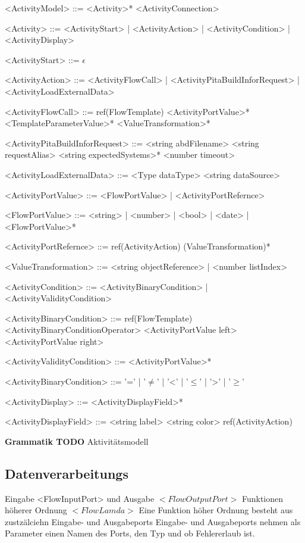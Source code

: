 \documentclass{article}
\begin{document}
    \begin{grammar}
        <ActivityModel> ::= <Activity>* <ActivityConnection>

        <Activity> ::= <ActivityStart>
        | <ActivityAction>
        | <ActivityCondition>
        | <ActivityDisplay>

        <ActivityStart> ::= $\epsilon$

        <ActivityAction> ::= <ActivityFlowCall>
        | <ActivityPitaBuildInforRequest>
        | <ActivityLoadExternalData>

        <ActivityFlowCall> ::= ref(FlowTemplate) <ActivityPortValue>* <TemplateParameterValue>* <ValueTransformation>*

        <ActivityPitaBuildInforRequest> ::= <string abdFilename> <string requestAlias> <string expectedSystems>* <number timeout>

        <ActivityLoadExternalData> ::= <Type dataType> <string dataSource>

        <ActivityPortValue> ::= <FlowPortValue>
        | <ActivityPortRefernce>

        <FlowPortValue> ::= <string>
        | <number>
        | <bool>
        | <date>
        | <FlowPortValue>*

        <ActivityPortRefernce> ::= ref(ActivityAction) (ValueTransformation)*

        <ValueTransformation> ::= <string objectReference>
        | <number listIndex>

        <ActivityCondition> ::= <ActivityBinaryCondition>
        | <ActivityValidityCondition>

        <ActivityBinaryCondition> ::= ref(FlowTemplate) <ActivityBinaryConditionOperator> <ActivityPortValue left> <ActivityPortValue right>

        <ActivityValidityCondition> ::= <ActivityPortValue>*

        <ActivityBinaryCondition> ::= '='
        | '$\neq$' 
        | '\textless' 
        | '$\leq$' 
        | '\textgreater' 
        | '$\geq$'

        <ActivityDisplay> ::= <ActivityDisplayField>*

        <ActivityDisplayField> ::= <string label> <string color> ref(ActivityAction)
    \end{grammar}
    \textbf{Grammatik TODO} Aktivitätsmodell
    \newpage
    \subsection{Datenverarbeitungs}
    Eingabe <FlowInputPort> und Ausgabe $<FlowOutputPort>$
    Funktionen höherer Ordnung $<FlowLamda>$
    Eine Funktion höher Ordnung besteht aus zustzälciehn Eingabe- und Ausgabeports
    Eingabe- und Ausgabeports nehmen als Parameter einen Namen des Ports, den Typ und ob Fehlererlaub ist.
\end{document}
